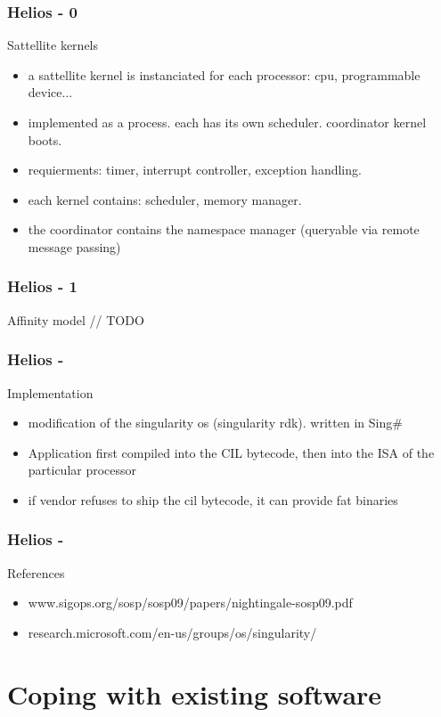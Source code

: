 
\begin{frame}
\frametitle{Helios - 0}
Sattellite kernels
\begin{itemize}
 \item a sattellite kernel is instanciated for each processor: cpu, programmable device...
 \item implemented as a process. each has its own scheduler. coordinator kernel boots.
 \item requierments: timer, interrupt controller, exception handling.
 \item each kernel contains: scheduler, memory manager.
 \item the coordinator contains the namespace manager (queryable via remote message passing)
\end{itemize}
\end{frame}


\begin{frame}
\frametitle{Helios - 1}
Affinity model // TODO
\end{frame}


\begin{frame}
\frametitle{Helios - }
Implementation
  \begin{itemize}
    \item modification of the singularity os (singularity rdk). written in Sing\#
    \item Application first compiled into the CIL bytecode, then into the ISA of the particular processor
    \item if vendor refuses to ship the cil bytecode, it can provide fat binaries
  \end{itemize}
\end{frame}


\begin{frame}
\frametitle{Helios - }
References
  \begin{itemize}
    \item www.sigops.org/sosp/sosp09/papers/nightingale-sosp09.pdf
    \item research.microsoft.com/en-us/groups/os/singularity/
  \end{itemize}
\end{frame}



\section{Coping with existing software}

